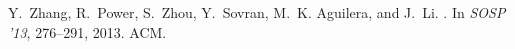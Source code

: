 \documentclass[11pt,dvipdfm]{article}
\begin{document}
\begin{thebibliography}{10}
\begin{small}
Y.~Zhang, R.~Power, S.~Zhou, Y.~Sovran, M.~K. Aguilera, and J.~Li.
.
\newblock In {\em SOSP '13}, 276--291, 2013. ACM.


\end{small} 
\end{thebibliography}
\end{document}
